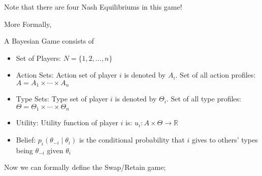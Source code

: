 \documentclass[12pt,a4paper,fleqn]{article}
\begin{document}
Note that there are four Nash Equilibriums in this game!

More Formally, 

A Bayesian Game consists of
\begin{itemize}

\item Set of Players: \(N=\{1,2, \ldots, n\}\)

\item Action Sets: Action set of player \(i\) is denoted by \(A_i\). Set of all action profiles: \(A=A_1 \times \cdots \times A_n\)

\item Type Sets: Type set of player \(i\) is denoted by \(\Theta_i\). Set of all type profiles: \(\Theta=\Theta_1 \times \cdots \times \Theta_n\)

\item Utility: Utility function of player \(i\) is: \(u_i: A \times \Theta \rightarrow \mathbb{R}\)

\item Belief: \(p_i\left(\theta_{-i} \mid \theta_i\right)\) is the conditional probability that \(i\) gives to others' types being \(\theta_{-i}\) given \(\theta_i\)
\end{itemize}


Now we can formally define the Swap/Retain game;
\end{document}
